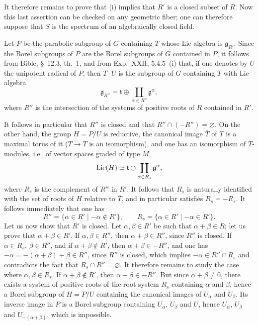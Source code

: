 It therefore remains to prove that (i) implies that $R'$ is a closed subset of $R$. Now this last assertion can be checked on any geometric fiber; one can therefore suppose that $S$ is the spectrum of an algebraically closed field.

Let $P$ be the parabolic subgroup of $G$ containing $T$ whose Lie algebra is $\mathfrak g_{R'}$. Since the Borel subgroups of $P$ are the Borel subgroups of $G$ contained in $P$, it follows from Bible, \S~12.3, th.~1, and from Exp.~XXII, 5.4.5~(i) that, if one denotes by $U$ the unipotent radical of $P$, then $T\cdot U$ is the subgroup of $G$ containing $T$ with Lie algebra
\[
\mathfrak g_{R''}=\mathfrak t\oplus\coprod_{\alpha\in R''}\mathfrak g^\alpha,
\]
where $R''$ is the intersection of the systems of positive roots of $R$ contained in $R'$.

It follows in particular that $R''$ is closed and that $R''\cap(-R'')=\varnothing$. On the other hand, the group $H=P/U$ is reductive, the canonical image $\overline T$ of $T$ is a maximal torus of it ($T\to\overline T$ is an isomorphism), and one has an isomorphism of $T$-modules, i.e.~of vector spaces graded of type $M$,
\[
\operatorname{Lie}(H)\simeq\mathfrak t\oplus\coprod_{\alpha\in R_s}\mathfrak g^\alpha,
\]
where $R_s$ is the complement of $R''$ in $R'$. It follows that $R_s$ is naturally identified with the set of roots of $H$ relative to $\overline T$, and in particular satisfies $R_s=-R_s$. It follows immediately that one has
\[
R''=\{\alpha\in R'\mid-\alpha\notin R'\},\qquad
R_s=\{\alpha\in R'\mid-\alpha\in R'\}.
\]
Let us now show that $R'$ is closed. Let $\alpha,\beta\in R'$ be such that $\alpha+\beta\in R$; let us prove that $\alpha+\beta\in R'$. If $\alpha,\beta\in R''$, then $\alpha+\beta\in R''$, since $R''$ is closed. If $\alpha\in R_s$, $\beta\in R''$, and if $\alpha+\beta\notin R'$, then $\alpha+\beta\in-R''$, and one has $-\alpha=-(\alpha+\beta)+\beta\in R''$, since $R''$ is closed, which implies $-\alpha\in R''\cap R_s$ and contradicts the fact that $R_s\cap R''=\varnothing$. It therefore remains to study the case where $\alpha,\beta\in R_s$. If $\alpha+\beta\notin R'$, then $\alpha+\beta\in-R''$. But since $\alpha+\beta\ne0$, there exists a system of positive roots of the root system $R_s$ containing $\alpha$ and $\beta$, hence a Borel subgroup of $H=P/U$ containing the canonical images of $U_\alpha$ and $U_\beta$. Its inverse image in $P$ is a Borel subgroup containing $U_\alpha$, $U_\beta$ and $U$, hence $U_\alpha$, $U_\beta$ and $U_{-(\alpha+\beta)}$, which is impossible.

